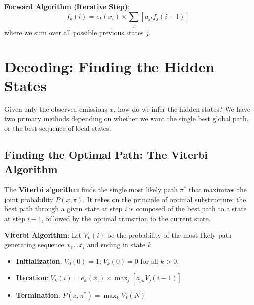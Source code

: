\begin{important}
\textbf{Forward Algorithm (Iterative Step)}:
\[ f_k(i) = e_k(x_i) \times \sum_j \left[ a_{jk} f_j(i-1) \right] \]
where we sum over all possible previous states $j$.
\end{important}

\section{Decoding: Finding the Hidden States}

Given only the observed emissions $x$, how do we infer the hidden states? We have two primary methods depending on whether we want the single best global path, or the best sequence of local states.

\subsection{Finding the Optimal Path: The Viterbi Algorithm}

The \textbf{Viterbi algorithm} finds the single most likely path $\pi^*$ that maximizes the joint probability $P(x, \pi)$. It relies on the principle of optimal substructure: the best path through a given state at step $i$ is composed of the best path to a state at step $i-1$, followed by the optimal transition to the current state.

\begin{important}
\textbf{Viterbi Algorithm}: Let $V_k(i)$ be the probability of the most likely path generating sequence $x_1 \dots x_i$ and ending in state $k$.
\begin{itemize}
    \item \textbf{Initialization}: $V_0(0) = 1$; $V_k(0) = 0$ for all $k > 0$.
    \item \textbf{Iteration}: $V_k(i) = e_k(x_i) \times \max_j \left[ a_{jk} V_j(i-1) \right]$
    \item \textbf{Termination}: $P(x, \pi^*) = \max_k V_k(N)$
\end{itemize}
\end{important}

